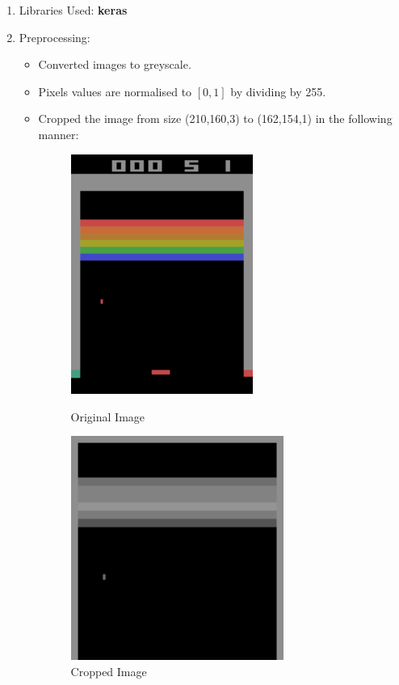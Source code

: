 \documentclass[a4 paper]{article}
\begin{document}
\begin{enumerate}
\item Libraries Used: \textbf{keras}
    \item Preprocessing:
    \begin{itemize}
        \item Converted images to greyscale.
        \item Pixels values are normalised to $[0,1]$ by dividing by 255.
        \item Cropped the image from size (210,160,3) to (162,154,1) in the following manner:
        \begin{figure}[H]
            \centering
            \begin{minipage}[b]{0.4\textwidth}
              \includegraphics[width=0.6\textwidth]{extra/1.png}
              \caption{Original Image}
            \end{minipage}
            \hfill
            \begin{minipage}[b]{0.35\textwidth}
              \includegraphics[width=0.7\textwidth]{extra/3.png}
              \caption{Cropped Image}
            \end{minipage}
          \end{figure}          
    \end{itemize}


\end{enumerate}
\end{document}
